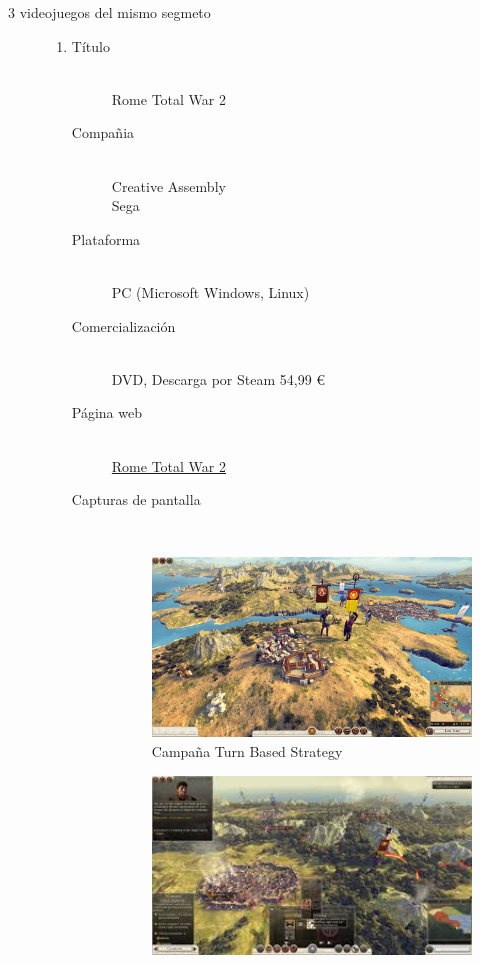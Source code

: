\documentclass[a4paper]{article}
\begin{document}
\begin{description}
  \item[3 videojuegos del mismo segmeto]
    \begin{enumerate}
      \item
      \begin{description}
        \item[Título] \hfill \\
        Rome Total War 2
        \item[Compañia] \hfill \\
        Creative Assembly \\Sega
        \item[Plataforma] \hfill \\
        PC (Microsoft Windows, Linux)
        \item[Comercialización] \hfill \\
        DVD, Descarga por Steam 54,99 \euro{}
        \item[Página web] \hfill \\
        \hyperlink{http://www.totalwar.com/en_us/rome2/}{Rome Total War 2}
        \item[Capturas de pantalla] \hfill \\
        \begin{figure}[ht!]
        \centering
        \includegraphics[width=90mm]{./Total-War-Rome-2-11.jpg}
        \caption{Campaña Turn Based Strategy}
        \label{overflow}
        \end{figure}
        \begin{figure}[ht!]
        \centering
        \includegraphics[width=90mm]{./images.jpeg}

\end{figure}
\end{description}
\end{enumerate}
\end{description}
\end{document}
